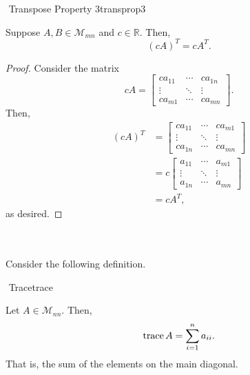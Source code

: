         \pagebreak
        \begin{theorem}{\Stop\,\,Transpose Property 3}{transprop3}
        
            Suppose \(A,B\in\mathcal{M}_{mn}\) and \(c\in\mathbb{R}\). Then,
            \begin{equation*}
                (cA)^T=cA^T.
            \end{equation*}
            \begin{proof}
                Consider the matrix
                \begin{equation*}
                    cA=\begin{bmatrix} ca_{11} & \cdots & ca_{1n} \\ \vdots & \ddots & \vdots \\
                    ca_{m1} & \cdots & ca_{mn} \end{bmatrix}.
                \end{equation*}
                Then,
                \begin{align*}
                    (cA)^T&=\begin{bmatrix} ca_{11} & \cdots & ca_{m1} \\ \vdots & \ddots & \vdots \\
                    ca_{1n} & \cdots & ca_{mn} \end{bmatrix} \\
                    &=c\begin{bmatrix} a_{11} & \cdots & a_{m1} \\ \vdots & \ddots & \vdots \\
                    a_{1n} & \cdots & a_{mn} \end{bmatrix} \\
                    &=cA^T,
                \end{align*}
                as desired.
            \end{proof}
        \end{theorem}
        \vphantom
        \\
        \\
        Consider the following definition.
        \begin{definition}{\Stop\,\,Trace}{trace}
            
            Let \(A\in\mathcal{M}_{nn}\). Then,
            \begin{equation*}
                \text{trace\,} A=\sum_{i=1}^na_{ii}.
            \end{equation*}
            That is, the sum of the elements on the main diagonal.
            
        \end{definition}
